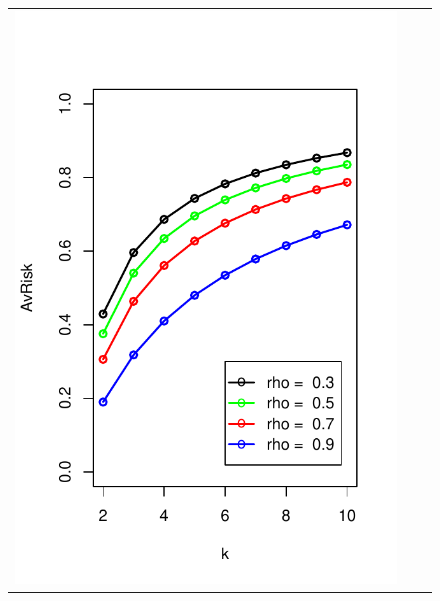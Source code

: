 \documentclass[12pt]{article}
\begin{document}
\begin{figure}[h]
\centering
\begin{tabular}{ccc}
\includegraphics[scale = 0.45, clip = true, trim = 0.05in 0 0.2in 0.6in]{extrapolation_figures/illus_rhos_avrisk.pdf} &

\end{tabular}
\end{figure}
\end{document}
